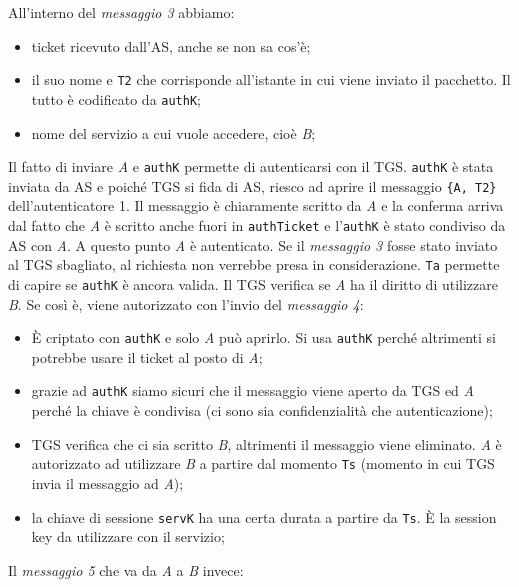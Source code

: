 All'interno del \textit{messaggio 3} abbiamo:

\begin{itemize}
      \item ticket ricevuto dall'AS, anche se non sa cos'è;
      \item il suo nome e \verb|T2| che corrisponde all'istante in cui viene
            inviato il pacchetto. Il tutto è
            codificato da \verb|authK|;
      \item nome del servizio a cui vuole accedere, cioè \textit{B};
\end{itemize}

Il fatto di inviare \textit{A} e \verb|authK| permette di autenticarsi con il TGS.
\verb|authK| è stata inviata da AS e poiché TGS si fida di AS, riesco ad aprire
il messaggio \verb|{A, T2}| dell'autenticatore 1. Il messaggio è chiaramente
scritto da \textit{A} e la conferma arriva dal fatto che \textit{A} è scritto
anche fuori in \verb|authTicket| e l'\verb|authK| è stato condiviso da AS
con \textit{A}. A questo punto \textit{A} è autenticato.
Se il \textit{messaggio 3} fosse stato inviato al TGS sbagliato, al richiesta
non verrebbe presa in considerazione. \verb|Ta| permette di capire se \verb|authK|
è ancora valida.
Il TGS verifica se \textit{A} ha il diritto di utilizzare \textit{B}. Se così è,
viene autorizzato con l'invio del \textit{messaggio 4}:

\begin{itemize}
      \item È criptato con \verb|authK| e solo \textit{A} può aprirlo.
            Si usa \verb|authK| perché altrimenti si potrebbe usare il ticket al
            posto di \textit{A};
      \item grazie ad \verb|authK| siamo sicuri che il messaggio viene aperto
            da TGS ed \textit{A} perché la chiave è condivisa
            (ci sono sia confidenzialità che autenticazione);
      \item TGS verifica che ci sia scritto \textit{B}, altrimenti il messaggio
            viene eliminato. \textit{A} è autorizzato ad utilizzare \textit{B}
            a partire dal momento \verb|Ts|
            (momento in cui TGS invia il messaggio ad \textit{A});
      \item la chiave di sessione \verb|servK| ha una certa durata a partire
            da \verb|Ts|. È la session key da utilizzare con il servizio;
\end{itemize}

Il \textit{messaggio 5} che va da \textit{A} a \textit{B} invece:

